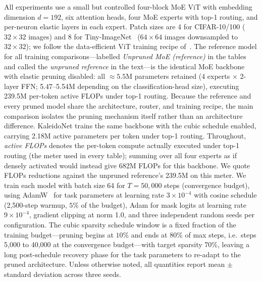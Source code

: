\documentclass[fleqn,10pt]{article}
\begin{document}
All experiments use a small but controlled four-block MoE ViT with
embedding dimension $d{=}192$, six attention heads, four MoE experts
with top-1 routing, and per-neuron elastic layers in each expert.
Patch sizes are 4 for CIFAR-10/100 ($32{\times}32$ images) and 8 for
Tiny-ImageNet~\citep{le2015tiny} ($64{\times}64$ images downsampled
to $32{\times}32$); we follow the data-efficient ViT training recipe
of~\citep{touvron2021training}. The reference model for all training
comparisons---labelled \emph{Unpruned MoE (reference)} in the tables
and called the \emph{unpruned reference} in the text---is the
identical MoE backbone with elastic pruning disabled: all
${\approx}5.5$M parameters retained (4 experts $\times$ 2-layer FFN;
5.47--5.54M depending on the classification-head size), executing
239.5M per-token active FLOPs under top-1 routing. Because the
reference and every pruned model share the architecture, router, and
training recipe, the main comparison isolates the pruning mechanism
itself rather than an architecture difference. KaleidoNet trains the
same backbone with the cubic schedule enabled, carrying 2.18M active
parameters per token under top-1 routing. Throughout, \emph{active
FLOPs} denotes the per-token compute actually executed under top-1
routing (the meter used in every table); summing over all four
experts as if densely activated would instead give 682M FLOPs for
this backbone. We quote FLOPs reductions against the unpruned
reference's 239.5M on this meter. We train each model with batch size 64 for
$T{=}50{,}000$ steps (convergence budget), using
AdamW~\citep{loshchilov2019decoupled} for task parameters at learning
rate $3\times10^{-4}$ with cosine schedule (2{,}500-step warmup,
$5\%$ of the budget),
Adam for mask logits at learning rate $9\times10^{-4}$, gradient
clipping at norm 1.0, and three independent random seeds per
configuration. The cubic sparsity schedule window is a fixed
fraction of the training budget---pruning begins at $10\%$ and ends
at $80\%$ of max steps, i.e.\ steps 5{,}000 to 40{,}000 at the
convergence budget---with target sparsity 70\%, leaving a long post-schedule
recovery phase for the task parameters to re-adapt to the pruned
architecture. Unless otherwise noted, all quantities report mean
$\pm$ standard deviation across three seeds.
\end{document}
